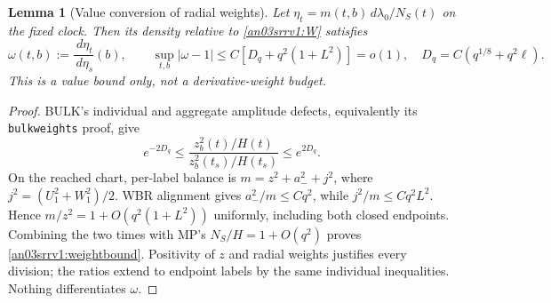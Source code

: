 \documentclass[11pt]{article}
\numberwithin{equation}{section}
\newtheorem{lemma}[theorem]{Lemma}\newtheorem{proposition}[theorem]{Proposition}
\theoremstyle{remark}\newtheorem{remark}[theorem]{Remark}
\newcommand{\dd}{\,d}\newcommand{\E}{\mathbb E}
\begin{document}
\begin{lemma}[Value conversion of radial weights]
\label{an03srrv1:weights}
Let $\eta_t=m(t,b)\dd\lambda_0/N_S(t)$ on the fixed clock.
Then its density relative to \eqref{an03srrv1:W} satisfies
\begin{equation}
 \omega(t,b):=\frac{\dd\eta_t}{\dd\eta_s}(b),\qquad
 \sup_{t,b}|\omega-1|
 \le C[D_q+q^2(1+L^2)]=o(1),\quad
 D_q=C(q^{1/8}+q^2\ell).
 \label{an03srrv1:weightbound}
\end{equation}
This is a value bound only, not a derivative-weight budget.
\end{lemma}
\begin{proof}
BULK's individual and aggregate amplitude defects, equivalently its
\texttt{bulkweights} proof, give
\[
 e^{-2D_q}\le
 \frac{z_b^2(t)/H(t)}{z_b^2(t_s)/H(t_s)}\le e^{2D_q}.
\]
On the reached chart, per-label balance is
$m=z^2+a_-^2+j^2$, where $j^2=(U_1^2+W_1^2)/2$.
WBR alignment gives $a_-^2/m\le Cq^2$, while
$j^2/m\le Cq^2L^2$. Hence $m/z^2=1+O(q^2(1+L^2))$
uniformly, including both closed endpoints. Combining the two
times with MP's $N_S/H=1+O(q^2)$ proves
\eqref{an03srrv1:weightbound}. Positivity of $z$ and radial weights
justifies every division; the ratios extend to endpoint labels by
the same individual inequalities. Nothing differentiates $\omega$.
\end{proof}
\end{document}

